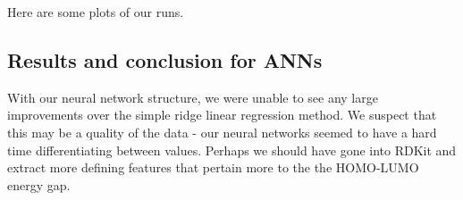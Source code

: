 \documentclass{article}
\begin{document}
Here are some plots of our runs.

\subsection{Results and conclusion for ANNs}
With our neural network structure, we were unable to see any large 
improvements over the simple ridge linear regression method.  We suspect
 that this may be a quality of the data - our neural networks seemed to 
 have a hard time differentiating between values.  Perhaps we should have gone
  into RDKit and extract more defining features that pertain more to the the 
  HOMO-LUMO energy gap.  
\end{document}
